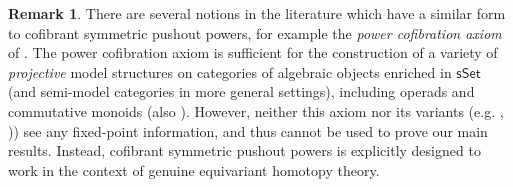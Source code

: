 \documentclass[a4paper,10pt
,draft
]{article}%
\numberwithin{equation}{section}
\numberwithin{figure}{section}
\theoremstyle{definition} %
\newtheorem{remark}[equation]{Remark}%
\newcommand{\sSet}{\ensuremath{\mathsf{sSet}}}%
\newcommand{\1}{\ensuremath{\mathbbm 1}}%
\begin{document}
\begin{remark}
      \label{CSPP_REM}
      There are several notions in the literature which have a similar form to cofibrant symmetric pushout powers,
      for example the \textit{power cofibration axiom} of \cite[Def. 4.5.4.2(iii)]{Lur17}.
      The power cofibration axiom %
      is sufficient for the construction of a variety of \textit{projective} model structures
      on categories of algebraic objects enriched in $\sSet$
      (and semi-model categories in more general settings),
      including operads and commutative monoids \cite[Prop. 4.5.4.6]{Lur17} (also \cite[Prop. 6.2.2, Thm. 6.2.3]{WY18}).
      However, neither this axiom nor its variants
      (e.g. \cite[Thm. 6.1.1 $(\clubsuit)$]{WY18}, \cite[Defn. 2.1 and Thm. 1.1]{DS18}))
      see any fixed-point information, and thus cannot be used to prove our main results.
      Instead, cofibrant symmetric pushout powers is explicitly designed to work in the context of genuine equivariant homotopy theory.



      
      


\end{remark}
\end{document}
